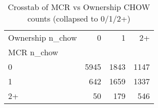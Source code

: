 \documentclass{article}
\begin{document}
\begin{table}
\centering
\caption{Crosstab of MCR vs Ownership CHOW counts (collapsed to 0/1/2+)}
\label{tab:chow_agreement_crosstab}
\begin{tabular}{lrrr}
\toprule
Ownership n_chow & 0 & 1 & 2+ \\
MCR n_chow &  &  &  \\
\midrule
0 & 5945 & 1843 & 1147 \\
1 & 642 & 1659 & 1337 \\
2+ & 50 & 179 & 546 \\
\bottomrule
\end{tabular}

\end{table}
\end{document}
